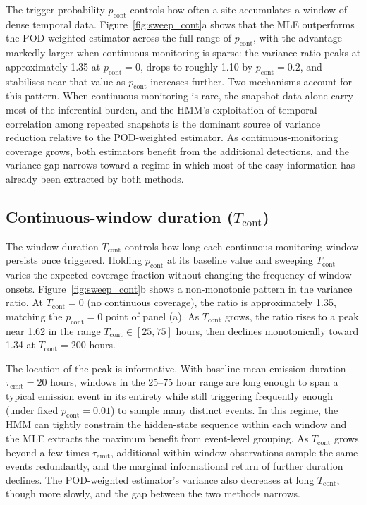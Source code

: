 \documentclass[11pt]{article}
\newcommand{\new}[1]{{\color{blue}#1}}
\begin{document}
\new{The trigger probability $p_{\text{cont}}$ controls how often a site accumulates a window of dense temporal data. Figure~\ref{fig:sweep_cont}a shows that the MLE outperforms the POD-weighted estimator across the full range of $p_{\text{cont}}$, with the advantage markedly larger when continuous monitoring is sparse: the variance ratio peaks at approximately 1.35 at $p_{\text{cont}} = 0$, drops to roughly 1.10 by $p_{\text{cont}} = 0.2$, and stabilises near that value as $p_{\text{cont}}$ increases further. Two mechanisms account for this pattern. When continuous monitoring is rare, the snapshot data alone carry most of the inferential burden, and the HMM's exploitation of temporal correlation among repeated snapshots is the dominant source of variance reduction relative to the POD-weighted estimator. As continuous-monitoring coverage grows, both estimators benefit from the additional detections, and the variance gap narrows toward a regime in which most of the easy information has already been extracted by both methods.}

\subsection{Continuous-window duration ($T_{\text{cont}}$)}
\label{sec:sweep_Tcont_SI}

\new{The window duration $T_{\text{cont}}$ controls how long each continuous-monitoring window persists once triggered. Holding $p_{\text{cont}}$ at its baseline value and sweeping $T_{\text{cont}}$ varies the expected coverage fraction without changing the frequency of window onsets. Figure~\ref{fig:sweep_cont}b shows a non-monotonic pattern in the variance ratio. At $T_{\text{cont}} = 0$ (no continuous coverage), the ratio is approximately 1.35, matching the $p_{\text{cont}} = 0$ point of panel (a). As $T_{\text{cont}}$ grows, the ratio rises to a peak near 1.62 in the range $T_{\text{cont}} \in [25, 75]$ hours, then declines monotonically toward 1.34 at $T_{\text{cont}} = 200$ hours.}

\new{The location of the peak is informative. With baseline mean emission duration $\tau_{\text{emit}} = 20$ hours, windows in the 25--75 hour range are long enough to span a typical emission event in its entirety while still triggering frequently enough (under fixed $p_{\text{cont}} = 0.01$) to sample many distinct events. In this regime, the HMM can tightly constrain the hidden-state sequence within each window and the MLE extracts the maximum benefit from event-level grouping. As $T_{\text{cont}}$ grows beyond a few times $\tau_{\text{emit}}$, additional within-window observations sample the same events redundantly, and the marginal informational return of further duration declines. The POD-weighted estimator's variance also decreases at long $T_{\text{cont}}$, though more slowly, and the gap between the two methods narrows.}
\end{document}
